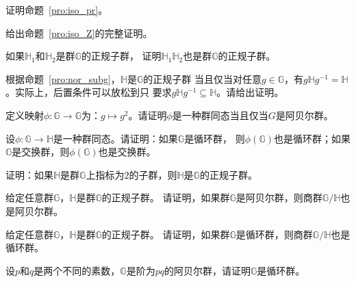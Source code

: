 \begin{problemset}
\item 证明命题~\ref{pro:iso_pr}。

\item 给出命题~\ref{pro:iso_Z}的完整证明。

\item 如果$\mathbb{H}_1$和$\mathbb{H}_2$是群$\mathbb{G}$的正规子群，
证明$\mathbb{H}_1 \mathbb{H}_2$也是群$\mathbb{G}$的正规子群。

\item 根据命题~\ref{pro:nor_subg}，$\mathbb{H}$是$\mathbb{G}$的正规子群
当且仅当对任意$g \in \mathbb{G}$，有$g\mathbb{H}g^{-1} = \mathbb{H}$。实际上，后置条件可以放松到只
要求$g\mathbb{H}g^{-1} \subseteq \mathbb{H}$。请给出证明。

\item 定义映射$\phi\colon \mathbb{G}\to \mathbb{G}$为：$g \mapsto g^2$。请证明$\phi$是一种群同态当且仅当$G$是阿贝尔群。

\item 设$\phi\colon \mathbb{G}\to \mathbb{H}$是一种群同态。请证明：如果$\mathbb{G}$是循环群，
则$\phi(\mathbb{G})$也是循环群；如果$\mathbb{G}$是交换群，则$\phi(\mathbb{G})$也是交换群。

\item 证明：如果$\mathbb{H}$是群$\mathbb{G}$上指标为$2$的子群，则$\mathbb{H}$是$\mathbb{G}$的正规子群。

\item 给定任意群$\mathbb{G}$，$\mathbb{H}$是群$\mathbb{G}$的正规子群。
请证明，如果群$\mathbb{G}$是阿贝尔群，则商群$\mathbb{G}/\mathbb{H}$也是阿贝尔群。

\item 给定任意群$\mathbb{G}$，$\mathbb{H}$是群$\mathbb{G}$的正规子群。
请证明，如果群$\mathbb{G}$是循环群，则商群$\mathbb{G}/\mathbb{H}$也是循环群。

 \item 设$p$和$q$是两个不同的素数，$\mathbb{G}$是阶为$pq$的阿贝尔群，请证明$\mathbb{G}$是循环群。
 

\end{problemset}
